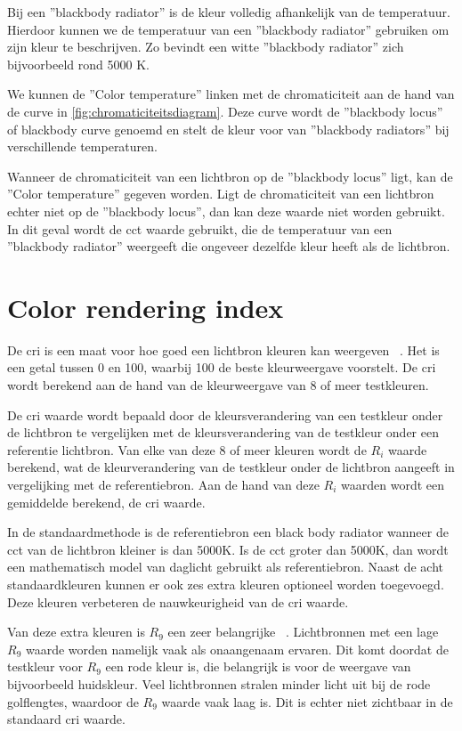 Bij een ''blackbody radiator'' is de kleur volledig afhankelijk van de temperatuur. Hierdoor kunnen we de temperatuur van een ''blackbody radiator'' gebruiken om zijn kleur te beschrijven. Zo bevindt een witte ''blackbody radiator'' zich bijvoorbeeld rond 5000 K.

We kunnen de ''Color temperature'' linken met de chromaticiteit aan de hand van de curve in \cref{fig:chromaticiteitsdiagram}. Deze curve wordt de ''blackbody locus'' of blackbody curve genoemd en stelt de kleur voor van ''blackbody radiators'' bij verschillende temperaturen.

Wanneer de chromaticiteit van een lichtbron op de ''blackbody locus'' ligt, kan de ''Color temperature'' gegeven worden. Ligt de chromaticiteit van een lichtbron echter niet op de ''blackbody locus'', dan kan deze waarde niet worden gebruikt. In dit geval wordt de \gls{cct} waarde gebruikt, die de temperatuur van een ''blackbody radiator'' weergeeft die ongeveer dezelfde kleur heeft als de lichtbron.

\section{Color rendering index}

De \gls{cri} is een maat voor hoe goed een lichtbron kleuren kan weergeven ~\cite{ColorRenderingLight,LightingTechnologyHandbook}. Het is een getal tussen 0 en 100, waarbij 100 de beste kleurweergave voorstelt. De \gls{cri} wordt berekend aan de hand van de kleurweergave van 8 of meer testkleuren.

De \gls{cri} waarde wordt bepaald door de kleursverandering van een testkleur onder de lichtbron te vergelijken met de kleursverandering van de testkleur onder een referentie lichtbron. Van elke van deze 8 of meer kleuren wordt de $R_i$ waarde berekend, wat de kleurverandering van de testkleur onder de lichtbron aangeeft in vergelijking met de referentiebron. Aan de hand van deze $R_i$ waarden wordt een gemiddelde berekend, de \gls{cri} waarde. 

In de standaardmethode is de referentiebron een black body radiator wanneer de \gls{cct} van de lichtbron kleiner is dan 5000K. Is de \gls{cct} groter dan 5000K, dan wordt een mathematisch model van daglicht gebruikt als referentiebron. Naast de acht standaardkleuren kunnen er ook zes extra kleuren optioneel worden toegevoegd. Deze kleuren verbeteren de nauwkeurigheid van de \gls{cri} waarde. 

Van deze extra kleuren is $R_9$ een zeer belangrijke ~\cite{WhatCRIR9}. Lichtbronnen met een lage $R_9$ waarde worden namelijk vaak als onaangenaam ervaren. Dit komt doordat de testkleur voor $R_9$ een rode kleur is, die belangrijk is voor de weergave van bijvoorbeeld huidskleur. Veel lichtbronnen stralen minder licht uit bij de rode golflengtes, waardoor de $R_9$ waarde vaak laag is. Dit is echter niet zichtbaar in de standaard \gls{cri} waarde.

